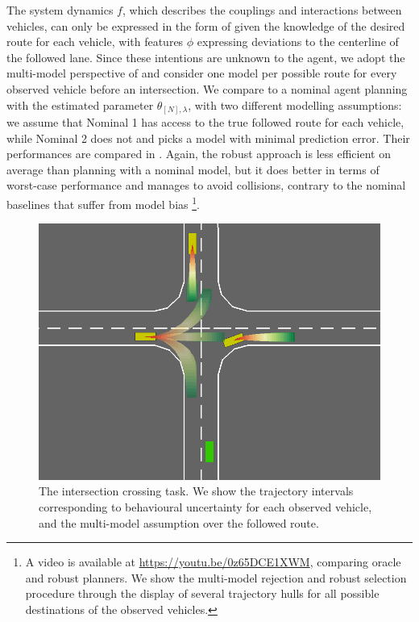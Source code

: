 The system dynamics $f$, which describes the couplings and interactions between vehicles, can only be expressed in the form of  given the knowledge of the desired route for each vehicle, with features $\phi$ expressing deviations to the centerline of the followed lane. Since these intentions are unknown to the agent, we adopt the multi-model perspective of  and consider one model per possible route for every observed vehicle before an intersection. We compare  to a nominal agent planning with the estimated parameter $\theta_{[N],\lambda}$, with two different modelling assumptions: we assume that Nominal 1 has access to the true followed route for each vehicle, while Nominal 2 does not and picks a model with minimal prediction error. Their performances are compared in . Again, the robust approach is less efficient on average than planning with a nominal model, but it does better in terms of worst-case performance and manages to avoid collisions, contrary to the nominal baselines that suffer from model bias \footnote{A video is available at \href{https://youtu.be/0z65DCE1XWM}{https://youtu.be/0z65DCE1XWM}, comparing oracle and robust planners. We show the multi-model rejection and robust selection procedure through the display of several trajectory hulls for all possible destinations of the observed vehicles.}.

\begin{figure}[t]
	\centering
	\includegraphics[width=0.7\linewidth]{img/highway-small}
	\caption{The intersection crossing task. We show the trajectory intervals corresponding to behavioural uncertainty for each observed vehicle, and the multi-model assumption over the followed route.}
\end{figure}

